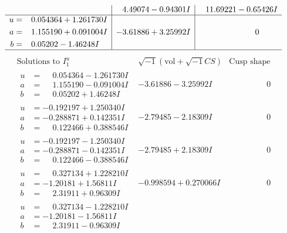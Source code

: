 \documentclass[1p]{elsarticle_modified}
\theoremstyle{definition}
\newcommand{\I}{\sqrt{-1}}
\begin{document}
$$\begin{array}{c|c|c}
 & \phantom{-}4.49074 - 0.94301 I & \phantom{-}11.69221 - 0.65426 I \\ \hline\begin{aligned}
u &= \phantom{-}0.054364 + 1.261730 I \\
a &= \phantom{-}1.155190 + 0.091004 I \\
b &= \phantom{-}0.05202 - 1.46248 I\end{aligned}
 & -3.61886 + 3.25992 I & \phantom{-0.000000 } 0\\
 \hline 
 \end{array}$$\newpage$$\begin{array}{c|c|c}  
\text{Solutions to }I^u_{1}& \I (\text{vol} + \sqrt{-1}CS) & \text{Cusp shape}\\
 \hline 
\begin{aligned}
u &= \phantom{-}0.054364 - 1.261730 I \\
a &= \phantom{-}1.155190 - 0.091004 I \\
b &= \phantom{-}0.05202 + 1.46248 I\end{aligned}
 & -3.61886 - 3.25992 I & \phantom{-0.000000 } 0 \\ \hline\begin{aligned}
u &= -0.192197 + 1.250340 I \\
a &= -0.288871 + 0.142351 I \\
b &= \phantom{-}0.122466 + 0.388546 I\end{aligned}
 & -2.79485 - 2.18309 I & \phantom{-0.000000 } 0 \\ \hline\begin{aligned}
u &= -0.192197 - 1.250340 I \\
a &= -0.288871 - 0.142351 I \\
b &= \phantom{-}0.122466 - 0.388546 I\end{aligned}
 & -2.79485 + 2.18309 I & \phantom{-0.000000 } 0 \\ \hline\begin{aligned}
u &= \phantom{-}0.327134 + 1.228210 I \\
a &= -1.20181 + 1.56811 I \\
b &= \phantom{-}2.31911 + 0.96309 I\end{aligned}
 & -0.998594 + 0.270066 I & \phantom{-0.000000 } 0 \\ \hline\begin{aligned}
u &= \phantom{-}0.327134 - 1.228210 I \\
a &= -1.20181 - 1.56811 I \\
b &= \phantom{-}2.31911 - 0.96309 I\end{aligned}

\end{array}$$
\end{document}
